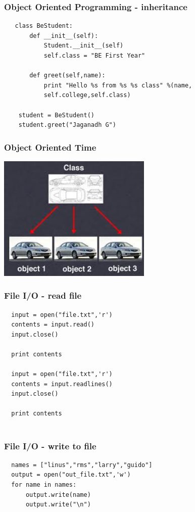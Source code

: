 \documentclass{beamer}
\begin{document}
\begin{frame}[fragile]
 \frametitle{Object Oriented Programming - inheritance}
  \begin{verbatim}
   class BeStudent:
       def __init__(self):
           Student.__init__(self)
           self.class = "BE First Year"

       def greet(self,name):
           print "Hello %s from %s %s class" %(name,
           self.college,self.class)

    student = BeStudent()
    student.greet("Jaganadh G")
  \end{verbatim}

\end{frame}

\begin{frame}
 \frametitle{Object Oriented Time}
\begin{center}
 \includegraphics[height=6cm]{oops.jpeg}
\end{center}

\end{frame}

\begin{frame}[fragile]
 \frametitle{File I/O - read file}
  \begin{verbatim}
  input = open("file.txt",'r')
  contents = input.read()
  input.close()

  print contents

  input = open("file.txt",'r')
  contents = input.readlines()
  input.close()

  print contents
  
  \end{verbatim}

\end{frame}

\begin{frame}[fragile]
 \frametitle{File I/O - write to file}
  \begin{verbatim}
  names = ["linus","rms","larry","guido"]
  output = open("out_file.txt",'w')
  for name in names:
      output.write(name)
      output.write("\n")

  \end{verbatim}

\end{frame}
\end{document}
